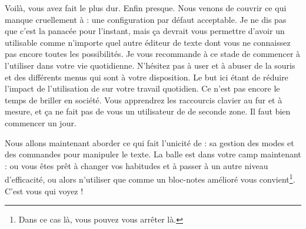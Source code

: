 Voilà, vous avez fait le plus dur. Enfin presque. Nous venons de couvrir ce qui manque cruellement à \vim : une configuration par défaut acceptable. Je ne dis pas que c'est la panacée pour l'instant, mais ça devrait vous permettre d'avoir un \vim utilisable comme n'importe quel autre éditeur de texte dont vous ne connaissez pas encore toutes les possibilités. Je vous recommande à ce stade de commencer à l'utiliser dans votre vie quotidienne. N'hésitez pas à user et à abuser de la souris et des différents menus qui sont à votre disposition. Le but ici étant de réduire l'impact de l'utilisation de \vim sur votre travail quotidien. Ce n'est pas encore le temps de briller en société. Vous apprendrez les raccourcis clavier au fur et à mesure, et ça ne fait pas de vous un utilisateur de \vim de seconde zone. Il faut bien commencer un jour.

Nous allons maintenant aborder ce qui fait l'unicité de \vim : sa gestion des modes et des commandes pour manipuler le texte. La balle est dans votre camp maintenant : ou vous êtes prêt à changer vos habitudes et à passer à un autre niveau d'efficacité, ou alors n'utiliser \vim que comme un bloc-notes amélioré vous convient\footnote{Dans ce cas là, vous pouvez vous arrêter là.}. C'est vous qui voyez !
